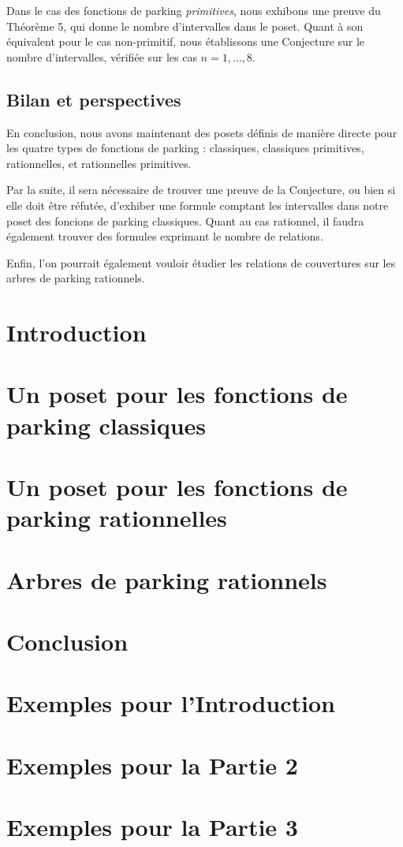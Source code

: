 \documentclass[11pt]{article}
\begin{document}
Dans le cas des fonctions de parking \emph{primitives}, nous exhibons
une preuve du Théorème 5, qui donne le nombre d'intervalles dans le
poset.
Quant à son équivalent pour le cas non-primitif, nous établissons une
Conjecture sur le nombre d'intervalles, vérifiée sur les cas
$n = 1, \ldots, 8$.

\subsection*{Bilan et perspectives}
En conclusion, nous avons maintenant des posets définis de manière
directe pour les quatre types de fonctions de parking : classiques, 
classiques primitives, rationnelles, et rationnelles primitives.

Par la suite, il sera nécessaire de trouver une preuve de la Conjecture,
ou bien si elle doit être réfutée, d'exhiber une formule comptant les
intervalles dans notre poset des foncions de parking classiques.
Quant au cas rationnel, il faudra également trouver des formules exprimant
le nombre de relations.

Enfin, l'on pourrait également vouloir étudier les relations de couvertures
sur les arbres de parking rationnels. 

\newpage

\tableofcontents

\section{Introduction}


\newpage
\section{Un poset pour les fonctions de parking classiques}


\newpage
\section{Un poset pour les fonctions de parking rationnelles}


\newpage
\section{Arbres de parking rationnels}


\newpage
\section{Conclusion}





\appendix

\newpage
\section{Exemples pour l'Introduction}


\newpage
\section{Exemples pour la Partie 2}


\newpage
\section{Exemples pour la Partie 3}

\end{document}
